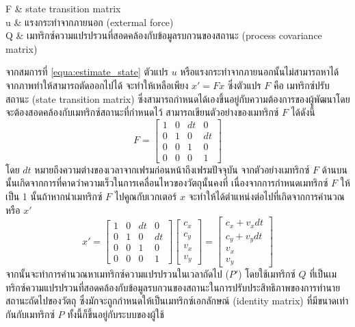 \begin{enumerate}
\begin{conditions}
		F		&	state transition matrix\\
		u		&	แรงกระทำจากภายนอก (extermal force)\\
		Q		&	เมทริกซ์ความแปรปรวนที่สอดคล้องกับข้อมูลรบกวนของสถานะ (process covariance matrix)
	\end{conditions}
	จากสมการที่ \ref{equa:estimate_state} ตัวแปร $u$ หรือแรงกระทำจากภายนอกนั้นไม่สามารถหาได้จากภาพทำให้สามารถตัดออกไปได้ จะทำให้เหลือเพียง $x' = Fx$ ซึ่งตัวแปร $F$
	คือ เมทริกซ์ปรับสถานะ (state transition matrix) ซึ่งสามารถกำหนดได้เองขึ้นอยู่กับความต้องการของผู้พัฒนาโดยจะต้องสอดคล้องกับเมทริกซ์สถานะที่กำหนดไว้ สามารถเขียนตัวอย่างของเมทริกซ์ $F$ ได้ดังนี้
	\begin{equation*}
		F = \begin{bmatrix}
			1& 0& dt& 0\\
			0& 1& 0& dt\\
			0& 0& 1& 0\\
			0& 0& 0& 1
		\end{bmatrix}
	\end{equation*}
	โดย $dt$ หมายถึงความต่างของเวลาจากเฟรมก่อนหน้าถึงเฟรมปัจจุบัน จากตัวอย่างเมทริกซ์ $F$ ด้านบนนั้นเกิดจากการที่คาดว่าความเร็วในการเคลื่อนไหวของวัตถุนั้นคงที่ 
	เนื่องจากการกำหนดเมทริกซ์ $F$ ให้เป็น 1 นั้นถ้าหากนำเมทริกซ์ $F$ ไปคูณกับเวกเตอร์ $x$ จะทำให้ได้ตำแหน่งต่อไปที่เกิดจากการคำนวณ หรือ $x'$
	\begin{equation*}
		x' = \begin{bmatrix}
			1& 0& dt& 0\\
			0& 1& 0& dt\\
			0& 0& 1& 0\\
			0& 0& 0& 1
		\end{bmatrix} \begin{bmatrix}
			c_x\\ c_y\\ v_x\\ v_y
		\end{bmatrix} = \begin{bmatrix}
			c_x + v_xdt\\ c_y + v_ydt\\ v_x\\ v_y
		\end{bmatrix}
	\end{equation*}
	จากนั้นจะทำการคำนวณหาเมทริกซ์ความแปรปรวนในเวลาถัดไป ($P'$) โดยใช้เมทริกซ์ $Q$ ที่เป็นเมทริกซ์ความแปรปรวนที่สอดคล้องกับข้อมูลรบกวนของสถานะในการปรับประสิทธิภาพของการทำนายสถานะถัดไปของวัตถุ 
	ซึ่งมักจะถูกกำหนดให้เป็นเมทริกซ์เอกลักษณ์ (identity matrix) ที่มีขนาดเท่ากันกับเมทริกซ์ $P$ ทั้งนี้ก็ขึ้นอยู่กับระบบของผู้ใช้

\end{enumerate}
